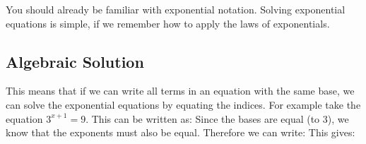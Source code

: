 \documentclass[10pt,a4paper,titlepage,twoside,openright]{report}
\begin{document}
You should already be familiar with exponential notation. Solving exponential
equations is simple, if we remember how to apply the laws of exponentials. 


\subsection{Algebraic Solution}


This means that if we can write all terms in an equation with the same base, we
can solve the exponential equations by equating the indices. For example take
the equation $3^{x+1}=9$. This can be written as:
Since the bases are equal (to 3), we know that the exponents must also be equal.
Therefore we can write:
This gives:
\end{document}
